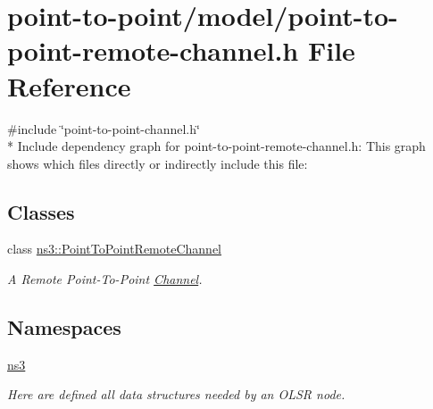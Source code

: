 \hypertarget{point-to-point-remote-channel_8h}{}\section{point-\/to-\/point/model/point-\/to-\/point-\/remote-\/channel.h File Reference}
\label{point-to-point-remote-channel_8h}
{\ttfamily \#include \char`\"{}point-\/to-\/point-\/channel.\+h\char`\"{}}\\*
Include dependency graph for point-\/to-\/point-\/remote-\/channel.h\+:
This graph shows which files directly or indirectly include this file\+:
\subsection*{Classes}
\begin{DoxyCompactItemize}
\item 
class \hyperlink{classns3_1_1PointToPointRemoteChannel}{ns3\+::\+Point\+To\+Point\+Remote\+Channel}
\begin{DoxyCompactList}\small\item\em A Remote Point-\/\+To-\/\+Point \hyperlink{classns3_1_1Channel}{Channel}. \end{DoxyCompactList}\end{DoxyCompactItemize}
\subsection*{Namespaces}
\begin{DoxyCompactItemize}
\item 
 \hyperlink{namespacens3}{ns3}
\begin{DoxyCompactList}\small\item\em Here are defined all data structures needed by an O\+L\+SR node. \end{DoxyCompactList}\end{DoxyCompactItemize}
